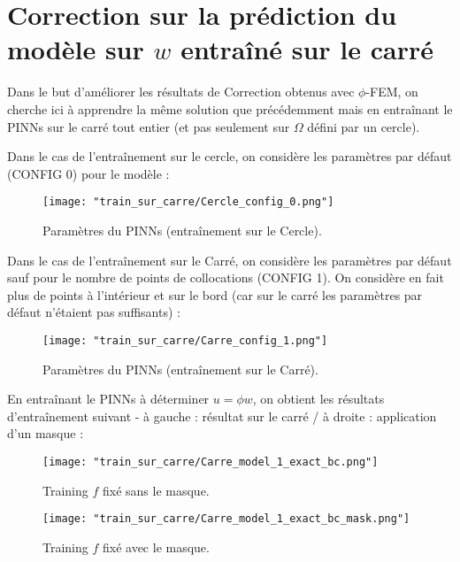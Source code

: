 \section{Correction sur la prédiction du modèle sur $w$ entraîné sur le carré}

Dans le but d'améliorer les résultats de Correction obtenus avec $\phi$-FEM, on cherche ici à apprendre la même solution que précédemment mais en entraînant le PINNs sur le carré tout entier (et pas seulement sur $\Omega$ défini par un cercle). 

Dans le cas de l'entraînement sur le cercle, on considère les paramètres par défaut (CONFIG 0) pour le modèle :

\begin{figure}[H]
	\centering
	\texttt{[image: "train\_sur\_carre/Cercle\_config\_0.png"]}
	\caption{Paramètres du PINNs (entraînement sur le Cercle).}
\end{figure}

Dans le cas de l'entraînement sur le Carré, on considère les paramètres par défaut sauf pour le nombre de points de collocations (CONFIG 1). On considère en fait plus de points à l'intérieur et sur le bord (car sur le carré les paramètres par défaut n'étaient pas suffisants) :

\begin{figure}[H]
	\centering
	\texttt{[image: "train\_sur\_carre/Carre\_config\_1.png"]}
	\caption{Paramètres du PINNs (entraînement sur le Carré).}
\end{figure}

En entraînant le PINNs à déterminer $u=\phi w$, on obtient les résultats d'entraînement suivant - à gauche : résultat sur le carré / à droite : application d'un masque :

\vspace{-20pt}
\begin{center}
	\begin{minipage}{0.48\linewidth}
		\begin{figure}[H]
			\centering
			\texttt{[image: "train\_sur\_carre/Carre\_model\_1\_exact\_bc.png"]}
			\caption{Training $f$ fixé sans le masque.}
		\end{figure}
	\end{minipage}
	\begin{minipage}{0.48\linewidth}
		\begin{figure}[H]
			\centering
			\texttt{[image: "train\_sur\_carre/Carre\_model\_1\_exact\_bc\_mask.png"]}
			\caption{Training $f$ fixé avec le masque.}
		\end{figure}
	\end{minipage}
\end{center}

